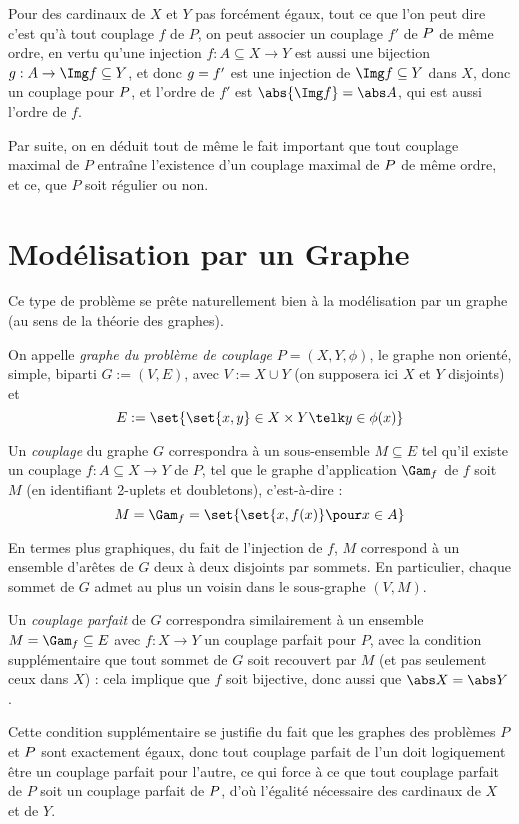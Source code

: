  Pour des cardinaux de $X$ et $Y$ pas forcément égaux, tout ce que l'on peut dire c'est qu'à tout couplage $f$ de $P$, on peut associer un couplage $f'$ de $P\-$ de même ordre, en vertu qu'une injection $f : A \subseteq X \to Y$ est aussi une bijection $g : A \to \Img f \subseteq Y$, et donc $g\- = f'$ est une injection de $\Img f \subseteq Y$ dans $X$, donc un couplage pour $P\-$, et l'ordre de $f'$ est $\abs{\Img f} = \abs A$, qui est aussi l'ordre de $f$.
 
 Par suite, on en déduit tout de même le fait important que tout couplage maximal de $P$ entraîne l'existence d'un couplage maximal de $P\-$ de même ordre, et ce, que $P$ soit régulier ou non.
 
 \section{Modélisation par un Graphe}
 
 Ce type de problème se prête naturellement bien à la modélisation par un graphe (au sens de la théorie des graphes).
 
 \SEP\jdefi On appelle \emph{graphe du problème de couplage} $P = (X,Y,\phi)$, le graphe non orienté, simple, biparti $G := (V, E)$, avec $V := X \cup Y$ (on supposera ici $X$ et $Y$ disjoints) et
 \[ E := \set{ \set{x,y} \in X \times Y \telk y \in \phi(x) }\]
 
 Un \emph{couplage} du graphe $G$ correspondra à un sous-ensemble $M \subseteq E$ tel qu'il existe un couplage $f : A \subseteq X \to Y$ de $P$, tel que le graphe d'application $\Gam_f$ de $f$ soit $M$ (en identifiant 2-uplets et doubletons), c'est-à-dire :
 \[ M = \Gam_f = \set{ \set{x,f(x)} \pour x \in A } \]
 
 En termes plus graphiques, du fait de l'injection de $f$, $M$ correspond à un ensemble d'arêtes de $G$ deux à deux disjoints par sommets. En particulier, chaque sommet de $G$ admet au plus un voisin dans le sous-graphe $(V, M)$.
 
 Un \emph{couplage parfait} de $G$ correspondra similairement à un ensemble $M = \Gam_f \subseteq E$ avec $f : X \to Y$ un couplage parfait pour $P$, avec la condition supplémentaire que tout sommet de $G$ soit recouvert par $M$ (et pas seulement ceux dans $X$) : cela implique que $f$ soit bijective, donc aussi que $\abs X = \abs Y$.
 
 Cette condition supplémentaire se justifie du fait que les graphes des problèmes $P$ et $P\-$ sont exactement égaux, donc tout couplage parfait de l'un doit logiquement être un couplage parfait pour l'autre, ce qui force à ce que tout couplage parfait de $P$ soit un couplage parfait de $P\-$, d'où l'égalité nécessaire des cardinaux de $X$ et de $Y$.
 
